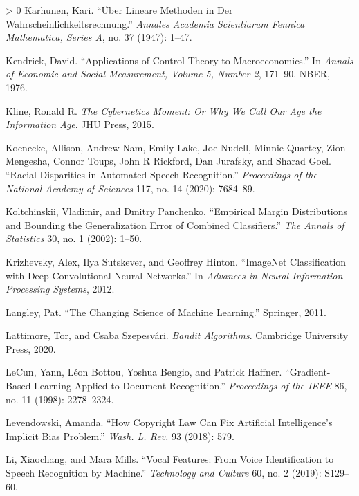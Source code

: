 \documentclass{tufte-book}
\newlength{\cslhangindent}
\newenvironment{CSLReferences}[3] %
 {%
  \setlength{\parindent}{0pt}
  \ifodd #1 \everypar{\setlength{\hangindent}{\cslhangindent}}\ignorespaces\fi
  \ifnum #2 > 0
  \setlength{\parskip}{#3\baselineskip}
  \fi
 }%
 {
 }
\begin{document}
\begin{CSLReferences}{1}{0}
\leavevmode\hypertarget{ref-karhunen1947lineare}{}%
Karhunen, Kari. {``{Ü}ber Lineare Methoden in Der
Wahrscheinlichkeitsrechnung.''} \emph{Annales Academia Scientiarum
Fennica Mathematica, Series A}, no. 37 (1947): 1--47.

\leavevmode\hypertarget{ref-kendrick1976applications}{}%
Kendrick, David. {``Applications of Control Theory to Macroeconomics.''}
In \emph{Annals of Economic and Social Measurement, Volume 5, Number 2},
171--90. NBER, 1976.

\leavevmode\hypertarget{ref-kline2015cybernetics}{}%
Kline, Ronald R. \emph{The Cybernetics Moment: Or Why We Call Our Age
the Information Age}. JHU Press, 2015.

\leavevmode\hypertarget{ref-koenecke2020racial}{}%
Koenecke, Allison, Andrew Nam, Emily Lake, Joe Nudell, Minnie Quartey,
Zion Mengesha, Connor Toups, John R Rickford, Dan Jurafsky, and Sharad
Goel. {``Racial Disparities in Automated Speech Recognition.''}
\emph{Proceedings of the National Academy of Sciences} 117, no. 14
(2020): 7684--89.

\leavevmode\hypertarget{ref-koltchinskii2002empirical}{}%
Koltchinskii, Vladimir, and Dmitry Panchenko. {``Empirical Margin
Distributions and Bounding the Generalization Error of Combined
Classifiers.''} \emph{The Annals of Statistics} 30, no. 1 (2002): 1--50.

\leavevmode\hypertarget{ref-KrizhevskySuHi12}{}%
Krizhevsky, Alex, Ilya Sutskever, and Geoffrey Hinton. {``ImageNet
Classification with Deep Convolutional Neural Networks.''} In
\emph{Advances in Neural Information Processing Systems}, 2012.

\leavevmode\hypertarget{ref-langley2011changing}{}%
Langley, Pat. {``The Changing Science of Machine Learning.''} Springer,
2011.

\leavevmode\hypertarget{ref-LattimoreBanditBook}{}%
Lattimore, Tor, and Csaba Szepesvári. \emph{Bandit Algorithms}.
Cambridge University Press, 2020.

\leavevmode\hypertarget{ref-lecun1998gradient}{}%
LeCun, Yann, Léon Bottou, Yoshua Bengio, and Patrick Haffner.
{``Gradient-Based Learning Applied to Document Recognition.''}
\emph{Proceedings of the IEEE} 86, no. 11 (1998): 2278--2324.

\leavevmode\hypertarget{ref-levendowski2018copyright}{}%
Levendowski, Amanda. {``How Copyright Law Can Fix Artificial
Intelligence's Implicit Bias Problem.''} \emph{Wash. L. Rev.} 93 (2018):
579.

\leavevmode\hypertarget{ref-li2019vocal}{}%
Li, Xiaochang, and Mara Mills. {``Vocal Features: From Voice
Identification to Speech Recognition by Machine.''} \emph{Technology and
Culture} 60, no. 2 (2019): S129--60.


\end{CSLReferences}
\end{document}
